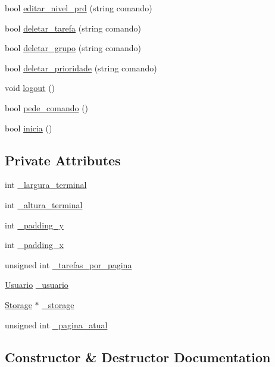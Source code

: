 \begin{DoxyCompactItemize}
\item 
bool \hyperlink{classTerminal_ad8941034607b656e5dcd279ce35a3f54}{editar\+\_\+nivel\+\_\+prd} (string comando)
\item 
bool \hyperlink{classTerminal_a207ca524c3b42aeb03d8e4aca1eee4a0}{deletar\+\_\+tarefa} (string comando)
\item 
bool \hyperlink{classTerminal_a915f2d35fcd5452b57af7af9af496c1e}{deletar\+\_\+grupo} (string comando)
\item 
bool \hyperlink{classTerminal_ac3e557f2c92b1f3a28e7a1363cd002a5}{deletar\+\_\+prioridade} (string comando)
\item 
void \hyperlink{classTerminal_ab5fabe06475207244e238a860e2aa469}{logout} ()
\item 
bool \hyperlink{classTerminal_a7447fa08bbace168d7e3043d13ad3fa4}{pede\+\_\+comando} ()
\item 
bool \hyperlink{classTerminal_aae5f31b6a4f5f1d7e7dcbbb438408fb4}{inicia} ()
\end{DoxyCompactItemize}
\subsection*{Private Attributes}
\begin{DoxyCompactItemize}
\item 
int \hyperlink{classTerminal_ac8f19b80b3c009efad6017cf5236510a}{\+\_\+largura\+\_\+terminal}
\item 
int \hyperlink{classTerminal_ac23f70e4a6bfe74cb430d10ce14f7d69}{\+\_\+altura\+\_\+terminal}
\item 
int \hyperlink{classTerminal_aa11effca90a9379eeee9776a41a79456}{\+\_\+padding\+\_\+y}
\item 
int \hyperlink{classTerminal_ac50acd9b920ff6d6759f953527869ea0}{\+\_\+padding\+\_\+x}
\item 
unsigned int \hyperlink{classTerminal_a51ad09d06d4ca9f3204d266d94c8fdcc}{\+\_\+tarefas\+\_\+por\+\_\+pagina}
\item 
\hyperlink{classUsuario}{Usuario} \hyperlink{classTerminal_aa5f996ee61173aaacf9b843fa211426e}{\+\_\+usuario}
\item 
\hyperlink{classStorage}{Storage} $\ast$ \hyperlink{classTerminal_a13bab737b1972d98bc4c8912fad52b2a}{\+\_\+storage}
\item 
unsigned int \hyperlink{classTerminal_ae16d3b2e118315e028a06cea51e1a5ac}{\+\_\+pagina\+\_\+atual}
\end{DoxyCompactItemize}


\subsection{Constructor \& Destructor Documentation}
\mbox{\label{classTerminal_aa448509b5aa1ece53c3d86385655be0e}} 

